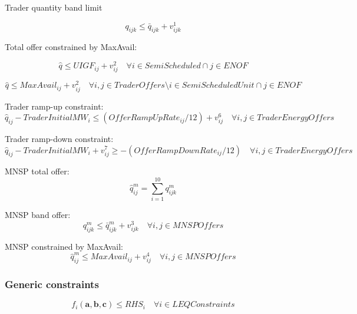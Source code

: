 \documentclass{article}
\begin{document}
Trader quantity band limit

\begin{equation}
	q_{ijk} \leq \bar{q}_{ijk} + v_{ijk}^{1}
\end{equation}

Total offer constrained by MaxAvail:

\begin{equation}
\hat{q} \leq UIGF_{ij} + v_{ij}^{2} \quad \forall i \in SemiScheduled \cap j \in {ENOF} 
\end{equation}

\begin{equation}
	\hat{q} \leq MaxAvail_{ij} + v_{ij}^{2} \quad \forall i, j \in TraderOffers \setminus  i \in SemiScheduledUnit \cap j \in {ENOF} 
\end{equation}


Trader ramp-up constraint:
\begin{equation}
\hat{q}_{ij} - TraderInitialMW_{i} \leq (OfferRampUpRate_{ij} / 12) + v^{6}_{ij} \quad \forall i,j \in TraderEnergyOffers
\end{equation}


Trader ramp-down constraint:
\begin{equation}
\hat{q}_{ij} - TraderInitialMW_{i} + v^{7}_{ij} \geq - (OfferRampDownRate_{ij} / 12) \quad \forall i,j \in TraderEnergyOffers
\end{equation}

MNSP total offer:
\begin{equation}
\hat{q}^{m}_{ij} = \sum\limits_{i = 1}^{10} q^{m}_{ijk}
\end{equation}

MNSP band offer:
\begin{equation}
q^{m}_{ijk} \leq \bar{q}^{m}_{ijk} + v_{ijk}^{3} \quad \forall i,j \in MNSPOffers
\end{equation}

MNSP constrained by MaxAvail:
\begin{equation}
\hat{q}^{m}_{ij} \leq MaxAvail_{ij} + v_{ij}^{4} \quad \forall i,j \in MNSPOffers 
\end{equation}

\subsubsection{Generic constraints}
\begin{equation}
	f_{i}(\bm{a}, \bm{b}, \bm{c}) \leq RHS_{i} \quad \forall i \in LEQConstraints
\end{equation}
\end{document}
